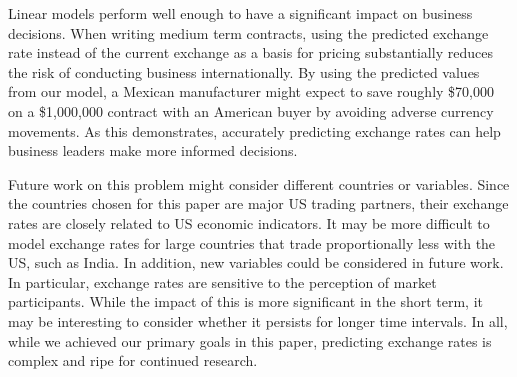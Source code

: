 \documentclass{sig-alternate-05-2015}
\begin{document}
Linear models perform well enough to have a significant impact on business decisions. When writing medium term contracts, using the predicted exchange rate instead of the current exchange as a basis for pricing substantially reduces the risk of conducting business internationally. By using the predicted values from our model, a Mexican manufacturer might expect to save roughly \$70,000 on a \$1,000,000 contract with an American buyer by avoiding adverse currency movements. As this demonstrates, accurately predicting exchange rates can help business leaders make more informed decisions.

Future work on this problem might consider different countries or variables. Since the countries chosen for this paper are major US trading partners, their exchange rates are closely related to US economic indicators. It may be more difficult to model exchange rates for large countries that trade proportionally less with the US, such as India. In addition, new variables could be considered in future work. In particular, exchange rates are sensitive to the perception of market participants. While the impact of this is more significant in the short term, it may be interesting to consider whether it persists for longer time intervals. In all, while we achieved our primary goals in this paper, predicting exchange rates is complex and ripe for continued research.  


     
\newenvironment{hangref}{\begin{list}{}{\setlength{\itemsep}{0pt}
\setlength{\parsep}{0pt}\setlength{\rightmargin}{0pt}
\setlength{\leftmargin}{+\parindent}
\setlength{\itemindent}{-\parindent}}}{\end{list}}
\end{document}
